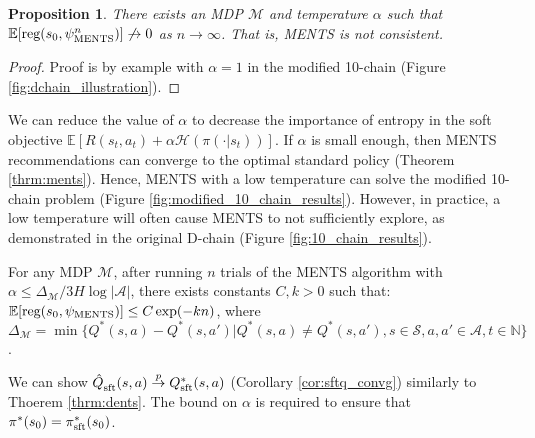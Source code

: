 \documentclass{article}
\newcommand{\todo}[1]{\hl{TODO: #1}}
\newcommand{\bb}[1]{\mathbb{#1}}
\newcommand{\cl}[1]{\mathcal{#1}}
\newcommand{\Qst}[3]{\hat{Q}^{#3}_{\textnormal{sft}}(#1,#2)}
\newcommand{\Qss}[2]{Q^*_{\textnormal{sft}}(#1,#2)}
\newcommand{\pis}{\pi^*_{\textnormal{sft}}}
\newcommand{\reg}{\textnormal{reg}}
\DeclareMathOperator*{\argmax}{arg\,max}
\newcommand{\rap}{\overset{p}{\to}}
\theoremstyle{plain}
\newtheorem{prop}{Proposition}[section]
\newenvironment{proofoutline}{\proof[Proof outline]}{\endproof}
\begin{document}
    \begin{prop}\label{prop:ments_bad}
        There exists an MDP $\cl{M}$ and temperature $\alpha$ such that $\bb{E}[\reg(s_0,\psi^n_{\textnormal{MENTS}})] \not\to 0$ as $n\to\infty$. That is, MENTS is not consistent.
    \end{prop}
    \begin{proof}
    		Proof is by example with $\alpha=1$ in the modified 10-chain (Figure \ref{fig:dchain_illustration}).
    \end{proof}
    We can reduce the value of $\alpha$ to decrease the importance of entropy in the soft objective $\bb{E}\left[R\left(s_{t}, a_{t}\right) + \alpha \mathcal{H}\left(\pi\left(\cdot|s_t\right)\right)\right]$.
    If $\alpha$ is small enough, then MENTS recommendations can converge to the optimal standard policy (Theorem \ref{thrm:ments}). Hence, MENTS with a low temperature can solve the modified 10-chain problem (Figure \ref{fig:modified_10_chain_results}). 
    However, in practice, a low temperature will often cause MENTS to not sufficiently explore, as demonstrated in the original D-chain (Figure \ref{fig:10_chain_results}).
    
    \begin{customthm}{3.2}\label{thrm:ments}
        For any MDP $\cl{M}$, after running $n$ trials of the MENTS algorithm with $\alpha \leq \Delta_{\cl{M}}/3H\log|\cl{A}|$, there exists constants $C,k>0$ such that: $\bb{E}[\reg(s_0,\psi_{\textnormal{MENTS}})] \leq C\exp(-kn)$, where $\Delta_{\cl{M}}=\min \{Q^*(s,a)-Q^*(s,a')\vert Q^*(s,a) \neq Q^*(s,a'),s\in\cl{S}, a,a'\in\cl{A},t\in\bb{N}\}$.
    \end{customthm}
    \begin{proofoutline}
    		We can show $\Qst{s}{a}{}\rap \Qss{s}{a}$ (Corollary \ref{cor:sftq_convg}) similarly to Thoerem \ref{thrm:dents}. The bound on $\alpha$ is required to ensure that $\pi^*(s_0)=\pis(s_0)$.
    \end{proofoutline}
    
\end{document}
